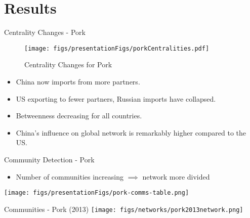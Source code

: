 \documentclass[10pt,xcolor={dvipsnames}]{beamer}
\begin{document}
\section{Results}
\begin{frame}{Centrality Changes - Pork}
    \begin{figure}
        \centering
        \caption*{\footnotesize Centrality Changes for Pork}
        \texttt{[image: figs/presentationFigs/porkCentralities.pdf]}
    \end{figure}
    \begin{itemize}
        \small
        \item[\ding{213}] China now imports from more partners. 
        \item[\ding{213}] US exporting to fewer partners, Russian imports have collapsed. 
        \item[\ding{213}] Betweenness decreasing for all countries. 
        \item[\ding{213}] China's influence on global network is remarkably higher compared to the US.  
    \end{itemize}
\end{frame}
\begin{frame}[plain]{Community Detection - Pork}
\begin{itemize}
 \footnotesize
    \item[\ding{213}] Number of communities increasing $\implies$ network more divided
\end{itemize}
\pause

\texttt{[image: figs/presentationFigs/pork-comms-table.png]}

\end{frame}

\begin{frame}{Communities - Pork (2013)}
    \texttt{[image: figs/networks/pork2013network.png]}
\end{frame}
\end{document}
